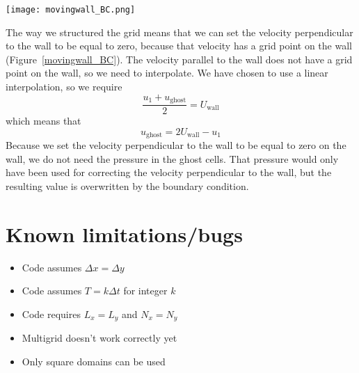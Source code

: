 \documentclass[12pt]{article}
\begin{document}
\begin{center}
\begin{figure*}
\center
\texttt{[image: movingwall\_BC.png]} 
\caption{Schematic of moving wall boundary condition interpolation.}
\label{movingwall_BC}
\end{figure*}
\end{center}

The way we structured the grid means that we can set the velocity perpendicular to the wall to be equal to zero, because that velocity has a grid point on the wall (Figure~\ref{movingwall_BC}).  The velocity parallel to the wall does not have a grid point on the wall, so we need to interpolate. We have chosen to use a linear interpolation, so we require
\[ \frac{u_1 + u_{\mathrm{ghost}}}{2} = U_{\mathrm{wall}}\]
which means that
\begin{equation}
u_{\mathrm{ghost}} = 2U_{\mathrm{wall}} - u_1
\end{equation}
Because we set the velocity perpendicular to the wall to be equal to zero on the wall, we do not need the pressure in the ghost cells.  That pressure would only have been used for correcting the velocity perpendicular to the wall, but the resulting value is overwritten by the boundary condition.

\section{Known limitations/bugs}
\begin{itemize}
\item Code assumes $\Delta x=\Delta y$
\item Code assumes $T = k\Delta t$ for integer $k$
\item Code requires $L_x = L_y$ and $N_x = N_y$
\item Multigrid doesn't work correctly yet
\item Only square domains can be used
\end{itemize}

\end{document}
